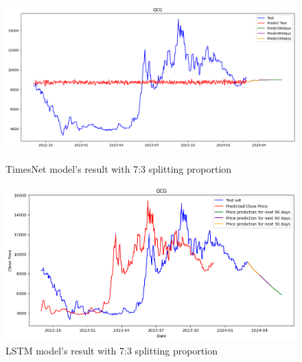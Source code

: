 \documentclass{ieeeojies}
\begin{document}
\begin{figure}[H]
  \centering
  \begin{minipage}{0.23\textwidth}
  \centering
  \includegraphics[width=1\textwidth]{bibliography/Figure/QCG_TimesNet(7-3).png}
  \caption{TimesNet model's result with 7:3 splitting proportion}
  \label{fig:1}
  \end{minipage}
  \hfill
  \begin{minipage}{0.23\textwidth}
  \centering
  \includegraphics[width=1\textwidth]{bibliography/Figure/QCG_LSTM(7-3).png}
  \caption{LSTM model's result with 7:3 splitting proportion}
  \label{fig:2}
  \end{minipage}
\end{figure}
\end{document}
